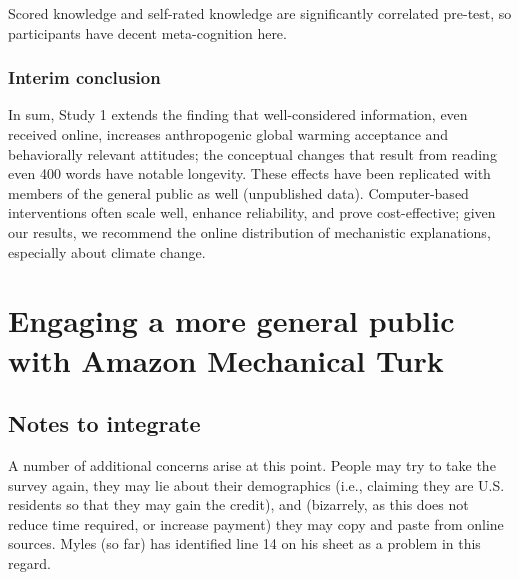 Scored knowledge and self-rated knowledge are significantly correlated pre-test,
so participants have decent meta-cognition here.

\subsubsection{Interim conclusion}

In sum, Study 1 extends the finding that well-considered information, even
received online, increases anthropogenic global warming acceptance and
behaviorally relevant attitudes; the conceptual changes that result from reading
even 400 words have notable longevity. These effects have been replicated with
members of the general public as well (unpublished data). Computer-based
interventions often scale well, enhance reliability, and prove cost-effective;
given our results, we recommend the online distribution of mechanistic
explanations, especially about climate change.  



\section{Engaging a more general public with Amazon Mechanical Turk}

\subsection{Notes to integrate}

A number of additional concerns arise at this point. People may try to take the
survey again, they may lie about their demographics (i.e., claiming they are
U.S. residents so that they may gain the credit), and (bizarrely, as this does
not reduce time required, or increase payment) they may copy and paste from
online sources. Myles (so far) has identified line 14 on his sheet as a problem
in this regard.
